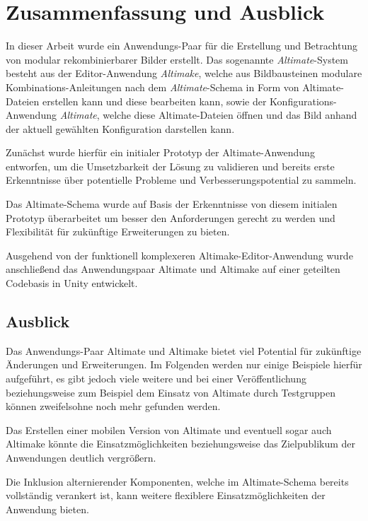 \documentclass[oneside]{ausarbeitung}
\begin{document}
\chapter{Zusammenfassung und Ausblick}
\label{cha:zusammenfassung}

In dieser Arbeit wurde ein Anwendungs-Paar für die Erstellung und Betrachtung von modular rekombinierbarer Bilder erstellt. Das sogenannte \textit{Altimate}-System besteht aus der Editor-Anwendung \textit{Altimake}, welche aus Bildbausteinen modulare Kombinations-Anleitungen nach dem \textit{Altimate}-Schema in Form von Altimate-Dateien erstellen kann und diese bearbeiten kann, sowie der Konfigurations-Anwendung \textit{Altimate}, welche diese Altimate-Dateien öffnen und das Bild anhand der aktuell gewählten Konfiguration darstellen kann.

Zunächst wurde hierfür ein initialer Prototyp der Altimate-Anwendung entworfen, um die Umsetzbarkeit der Lösung zu validieren und bereits erste Erkenntnisse über potentielle Probleme und Verbesserungspotential zu sammeln.

Das Altimate-Schema wurde auf Basis der Erkenntnisse von diesem initialen Prototyp überarbeitet um besser den Anforderungen gerecht zu werden und Flexibilität für zukünftige Erweiterungen zu bieten.

Ausgehend von der funktionell komplexeren Altimake-Editor-Anwendung wurde anschließend das Anwendungspaar Altimate und Altimake auf einer geteilten Codebasis in Unity entwickelt.



\section{Ausblick}
\label{sec:ausblick}

Das Anwendungs-Paar Altimate und Altimake bietet viel Potential für zukünftige Änderungen und Erweiterungen. Im Folgenden werden nur einige Beispiele hierfür aufgeführt, es gibt jedoch viele weitere und bei einer Veröffentlichung beziehungsweise zum Beispiel dem Einsatz von Altimate durch Testgruppen können zweifelsohne noch mehr gefunden werden.

Das Erstellen einer mobilen Version von Altimate und eventuell sogar auch Altimake könnte die Einsatzmöglichkeiten beziehungsweise das Zielpublikum der Anwendungen deutlich vergrößern. 

Die Inklusion alternierender Komponenten, welche im Altimate-Schema bereits vollständig verankert ist, kann weitere flexiblere Einsatzmöglichkeiten der Anwendung bieten.
\end{document}
